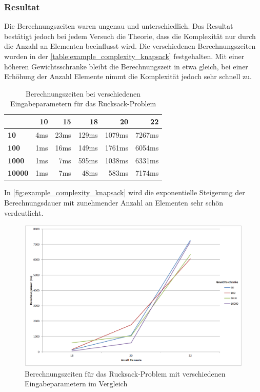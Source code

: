 \subsubsection{Resultat}
Die Berechnungszeiten waren ungenau und unterschiedlich. Das Resultat bestätigt jedoch bei jedem Versuch die Theorie, dass die Komplexität nur durch die Anzahl an Elementen 
beeinflusst wird. Die verschiedenen Berechnungszeiten wurden in der \autoref{table:example_complexity_knapsack} festgehalten. Mit einer höheren Gewichtsschranke bleibt die 
Berechnungszeit in etwa gleich, bei einer Erhöhung der Anzahl Elemente nimmt die Komplexität jedoch sehr schnell zu.

\begin{table}[ht]
\centering
  \begin{tabular}{ l | r | r | r | r | r }
	\hline
	\rowcolor{gray}
	\backslashbox{Gewichtsschranke:}{Anzahl an Elemente:}	& \textbf{10}	& \textbf{15} 	& \textbf{18}	& \textbf{20}	& \textbf{22}\\ \hline
	\textbf{10}							& 4ms			& 23ms		& 129ms		& 1079ms		& 7267ms 	\\ \hline
	\textbf{100}							& 1ms			& 16ms		& 149ms		& 1761ms		& 6054ms	\\ \hline
	\textbf{1000}						& 1ms			& 7ms			& 595ms		& 1038ms		& 6331ms	\\ \hline
	\textbf{10000}						& 1ms			& 7ms			& 48ms		& 583ms		& 7174ms	\\ \hline
  \end{tabular}
   \caption[Berechnungszeiten bei verschiedenen Eingabeparametern für das Rucksack-Problem]{Berechnungszeiten bei verschiedenen Eingabeparametern für das Rucksack-Problem}
   \label{table:example_complexity_knapsack}
\end{table}

In \autoref{fig:example_complexity_knapsack} wird die exponentielle Steigerung der Berechnungsdauer mit zunehmender Anzahl an Elementen sehr schön verdeutlicht.

\begin{figure}[h]
\centering
\includegraphics[scale=0.45]{images/excel/knapsack_complexity_example.png}
\caption[Berechnungszeiten für das Rucksack-Problem mit verschiedenen Eingabeparametern im Vergleich]{Berechnungszeiten für das Rucksack-Problem mit verschiedenen Eingabeparametern 
im Vergleich \selfmade{}}
\label{fig:example_complexity_knapsack}
\end{figure}

